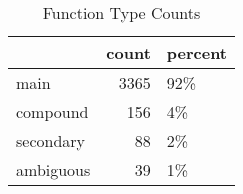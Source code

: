 \begin{table}[htbp!]
\centering
\caption{Function Type Counts}
\label{table:ALL_functype_cp}
\begin{tabular}{lrl}
\toprule
{} &  count & percent \\
\midrule
main      &   3365 &     92\% \\
compound  &    156 &      4\% \\
secondary &     88 &      2\% \\
ambiguous &     39 &      1\% \\
\bottomrule
\end{tabular}
\end{table}

